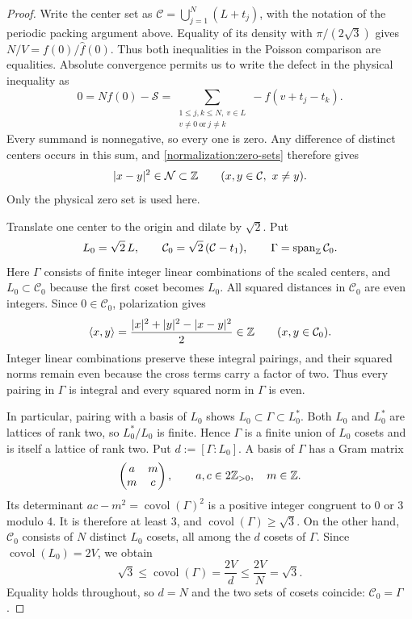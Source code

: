 \begin{proof}
Write the center set as
$\mathcal C=\bigcup_{j=1}^N(L+t_j)$, with the notation of the periodic
packing argument above.  Equality of its density with $\pi/(2\sqrt3)$ gives
$N/V=f(0)/\widehat f(0)$.  Thus both inequalities in the Poisson comparison
are equalities.  Absolute convergence permits us to write the defect in
the physical inequality as
\[
 0=Nf(0)-\mathcal S
 =\sum_{\substack{1\le j,k\le N,\ v\in L\\
                   v\ne0\ \text{or}\ j\ne k}}
       -f(v+t_j-t_k).
\]
Every summand is nonnegative, so every one is zero.  Any difference of
distinct centers occurs in this sum, and \eqref{normalization:zero-sets}
therefore gives
\[
 |x-y|^2\in\mathcal N\subset\mathbb Z
 \qquad(x,y\in\mathcal C,\ x\ne y).
\]
Only the physical zero set is used here.

Translate one center to the origin and dilate by $\sqrt2$.  Put
\[
 L_0=\sqrt2\,L,\qquad
 \mathcal C_0=\sqrt2\,(\mathcal C-t_1),\qquad
 \Gamma=\operatorname{span}_{\mathbb Z}\mathcal C_0.
\]
Here $\Gamma$ consists of finite integer linear combinations of the
scaled centers, and $L_0\subset\mathcal C_0$ because the first coset becomes
$L_0$.  All squared distances in $\mathcal C_0$ are even integers.  Since
$0\in\mathcal C_0$, polarization gives
\[
 \langle x,y\rangle
 =\frac{|x|^2+|y|^2-|x-y|^2}{2}\in\mathbb Z
 \qquad(x,y\in\mathcal C_0).
\]
Integer linear combinations preserve these integral pairings, and their
squared norms remain even because the cross terms carry a factor of two.
Thus every pairing in $\Gamma$ is integral and every squared norm in
$\Gamma$ is even.

In particular, pairing with a basis of $L_0$ shows
$L_0\subset\Gamma\subset L_0^*$.  Both $L_0$ and $L_0^*$ are lattices of
rank two, so $L_0^*/L_0$ is finite.  Hence $\Gamma$ is a finite union of
$L_0$ cosets and is itself a lattice of rank two.  Put
$d:=[\Gamma:L_0]$.  A basis of $\Gamma$ has a Gram matrix
\[
 \begin{pmatrix}a&m\\m&c\end{pmatrix},
 \qquad a,c\in2\mathbb Z_{>0},\quad m\in\mathbb Z.
\]
Its determinant $ac-m^2=\operatorname{covol}(\Gamma)^2$ is a positive
integer congruent to $0$ or $3$ modulo $4$.  It is therefore at least $3$,
and $\operatorname{covol}(\Gamma)\ge\sqrt3$.
On the other hand, $\mathcal C_0$ consists of $N$ distinct $L_0$ cosets,
all among the $d$ cosets of $\Gamma$.  Since
$\operatorname{covol}(L_0)=2V$, we obtain
\[
 \sqrt3\le\operatorname{covol}(\Gamma)
 =\frac{2V}{d}\le\frac{2V}{N}=\sqrt3.
\]
Equality holds throughout, so $d=N$ and the two sets of cosets coincide:
$\mathcal C_0=\Gamma$.


\end{proof}
